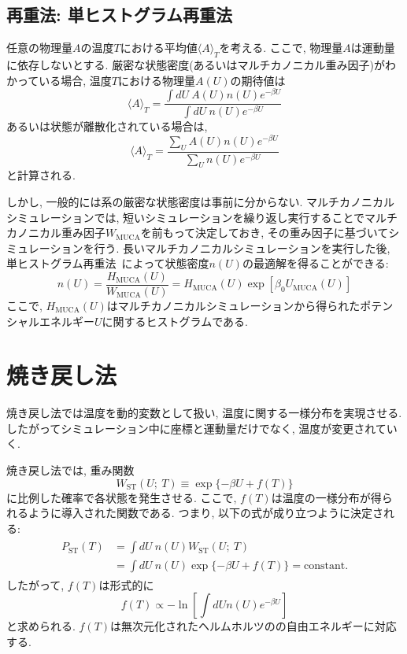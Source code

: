 \subsection{再重法: 単ヒストグラム再重法}

任意の物理量$A$の温度$T$における平均値$\langle A \rangle_{T}$を考える. 
ここで, 物理量$A$は運動量に依存しないとする. 
厳密な状態密度(あるいはマルチカノニカル重み因子)がわかっている場合, 温度$T$における物理量$A(U)$の期待値は
\begin{equation}
  \langle A \rangle_{T} =
  \frac{\int dU ~A(U) n(U) e^{-\beta U}}{\int dU~ n(U) e^{-\beta U}}
\end{equation}
あるいは状態が離散化されている場合は, 
\begin{equation}
  \langle A \rangle_{T} =
  \frac{\sum_{U} A(U) n(U) e^{-\beta U}}{\sum_{U} n(U) e^{-\beta U}}
\end{equation}
と計算される. 

しかし, 一般的には系の厳密な状態密度は事前に分からない. 
マルチカノニカルシミュレーションでは, 短いシミュレーションを繰り返し実行することでマルチカノニカル重み因子$W_{\mathrm{MUCA}}$を前もって決定しておき, その重み因子に基づいてシミュレーションを行う. 
長いマルチカノニカルシミュレーションを実行した後, 単ヒストグラム再重法~\cite{Ferrenberg1988}によって状態密度$n(U)$の最適解を得ることができる:
\begin{equation}
  n(U) = \frac{H_{\mathrm{MUCA}}(U)}{W_{\mathrm{MUCA}}(U)} = H_{\mathrm{MUCA}}(U) \exp\left[\beta_{0} U_{\mathrm{MUCA}}(U)\right]
\end{equation}
ここで, $H_{\mathrm{MUCA}}(U)$はマルチカノニカルシミュレーションから得られたポテンシャルエネルギー$U$に関するヒストグラムである. 

\section{焼き戻し法}
焼き戻し法では温度を動的変数として扱い, 温度に関する一様分布を実現させる. 
したがってシミュレーション中に座標と運動量だけでなく, 温度が変更されていく. 

焼き戻し法では, 重み関数
\begin{equation}
    W_{\mathrm{ST}}(U;~T) \equiv \exp\{-\beta U + f(T)\}
\end{equation}
に比例した確率で各状態を発生させる. 
ここで, $f(T)$は温度の一様分布が得られるように導入された関数である. 
つまり, 以下の式が成り立つように決定される:
\begin{align}
    \begin{split}
    P_{\mathrm{ST}}(T) &=
    \int dU~ n(U) W_{\mathrm{ST}}(U;~T) \\ &=
    \int dU~ n(U) \exp\{-\beta U + f(T)\} =
    \mathrm{constant}.
    \end{split}
\end{align}
したがって, $f(T)$は形式的に
\begin{equation}
  f(T) \propto
  - \ln\left[\int dU n(U) e^{-\beta U}\right]
\end{equation}
と求められる. $f(T)$は無次元化されたヘルムホルツのの自由エネルギーに対応する. 

